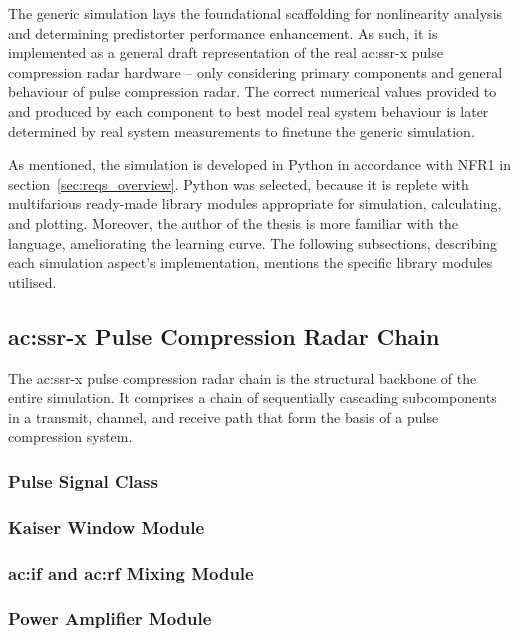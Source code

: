 The generic simulation lays the foundational scaffolding for nonlinearity analysis and determining predistorter performance enhancement. As such, it is implemented as a general draft representation of the real \gls{ac:ssr-x} pulse compression radar hardware -- only considering primary components and general behaviour of pulse compression radar. The correct numerical values provided to and produced by each component to best model real system behaviour is later determined by real system measurements to finetune the generic simulation.

As mentioned, the simulation is developed in Python in accordance with NFR1 in section~\ref{sec:reqs_overview}. Python was selected, because it is replete with multifarious ready-made library modules appropriate for simulation, calculating, and plotting. Moreover, the author of the thesis is more familiar with the language, ameliorating the learning curve. The following subsections, describing each simulation aspect's implementation, mentions the specific library modules utilised.   

\subsection{\gls{ac:ssr-x} Pulse Compression Radar Chain}

The \gls{ac:ssr-x} pulse compression radar chain is the structural backbone of the entire simulation. It comprises a chain of sequentially cascading subcomponents in a transmit, channel, and receive path that form the basis of a pulse compression system.     

\subsubsection{Pulse Signal Class}

\subsubsection{Kaiser Window Module}

\subsubsection{\gls{ac:if} and \gls{ac:rf} Mixing Module}

\subsubsection{Power Amplifier Module}


